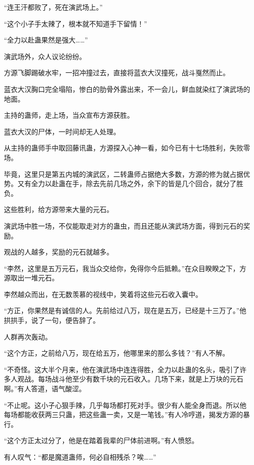 
\begin{this_body}

“连王汗都败了，死在演武场上。”

“这个小子手太辣了，根本就不知道手下留情！”

“全力以赴蛊果然是强大……”

演武场外，众人议论纷纷。

方源飞脚踢破水牢，一招冲撞过去，直接将蓝衣大汉撞死，战斗戛然而止。

蓝衣大汉胸口完全塌陷，惨白的肋骨外露出来，不一会儿，鲜血就染红了演武场的地面。

主持的蛊师，走上场，当众宣布方源获胜。

蓝衣大汉的尸体，一时间却无人处理。

从主持的蛊师手中取回藤讯蛊，方源探入心神一看，如今已有十七场胜利，失败零场。

毕竟，这里只是第五内城的演武区，二转蛊师占据绝大多数，方源的修为就占据优势。又有全力以赴蛊在手，除去先前几场之外，余下的皆是几个回合，就分了胜负。

这些胜利，给方源带来大量的元石。

演武场中胜一场，不仅能取走对方的蛊虫，而且还能从演武场方面，得到元石的奖励。

观战的人越多，奖励的元石就越多。

“李然，这里是五万元石，我当众交给你，免得你今后抵赖。”在众目睽睽之下，方源取出一堆元石。

李然越众而出，在无数羡慕的视线中，笑着将这些元石收入囊中。

“方正，你果然是有诚信的人。先前给过八万，现在是五万，已经是十三万了。”他拱拱手，说了一句，便告辞了。

人群再次轰动。

“这个方正，之前给八万，现在给五万，他哪里来的那么多钱？”有人不解。

“不奇怪。这大半个月来，他在演武场中连连得胜，全力以赴蛊的名头，吸引了许多人观战。每场战斗他至少有数千块的元石收入。几场下来，就是上万块的元石啊。”有人答道，语气酸涩。

“不止呢。这小子心狠手辣，几乎每场都打死对手。很少有人能全身而退。所以他每场都能收获两三只蛊，把这些蛊一卖，又是一笔钱。”有人冷哼道，揭发方源的暴行。

“这个方正太过分了，他是在踏着我辈的尸体前进啊。”有人愤怒。

有人叹气：“都是魔道蛊师，何必自相残杀？唉……”


\end{this_body}
